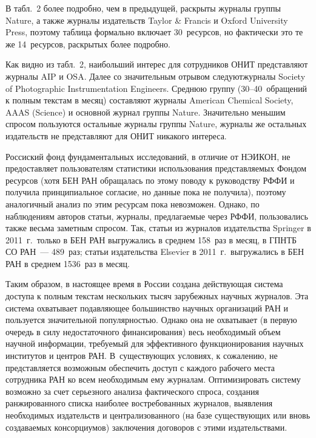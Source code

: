 \begin{multicols}{2}
     
     В табл.~2 более подробно, чем в предыдущей, раскрыты журналы 
группы Nature, а также журналы издательств Taylor \& Francis и Oxford 
University Press, поэтому таблица формально включает 30~ресурсов, но 
фактически это те же 14~ресурсов, раскрытых более подробно.
     
     Как видно из табл.~2, наибольший интерес для сотрудников ОНИТ 
     представляют журналы  AIP и OSA. Далее со 
значительным отрывом следуют\linebreak журна\-лы Society of Photographic 
Instrumentation Engineers. Среднюю группу (30--40~обращений к полным 
текстам в месяц) составляют журналы American Chemical Society, AAAS 
(Science) и основной журнал группы Nature. Значительно меньшим спросом 
пользуются остальные журналы группы Nature, журналы же остальных 
издательств не представляют для ОНИТ никакого интереса. 
     
     Россиский фонд фундаментальных исследований, в отличие от \mbox{НЭИКОН}, не 
     пред\-остав\-ля\-ет пользователям 
статистики использования пред\-став\-ля\-емых Фондом ресурсов (хотя БЕН РАН 
\mbox{обращалась} по этому поводу к руководству \mbox{РФФИ} и получила 
принципиальное согласие, но данные пока не получила), поэтому 
аналогичный анализ по этим ресурсам пока невозможен. Однако, по 
наблюдениям авторов статьи, журналы, предлагаемые через РФФИ, 
пользовались также весьма заметным спросом. Так, статьи из журналов 
издательства Springer в 2011~г.\ только в БЕН РАН выгружались в среднем 
158~раз в месяц, в ГПНТБ СО РАН~--- 489~раз; статьи издательства Elsevier 
в 2011~г.\ выгружались в БЕН РАН в среднем 1536~раз в месяц.
     
     Таким образом, в настоящее время в России созда\-на действующая 
система доступа к полным текстам нескольких тысяч зарубежных научных 
журналов. Эта система охватывает подавляющее большинство научных 
организаций РАН и пользуется значительной популярностью. Однако она не 
охватывает (в первую очередь в силу недостаточного финансирования) весь 
необходимый объем научной информации, требуемый для эффективного 
функционирования научных институтов и центров РАН. В~существующих 
условиях, к сожалению, не представляется возможным обеспечить доступ с 
каждого рабочего места сотрудника РАН ко всем необходимым ему 
журналам. Оптимизировать систему возможно за счет серьезного анализа 
фактического спроса, создания ранжированного списка наиболее 
востребованных журналов, выявления необходимых издательств и 
централизованного (на базе существующих или вновь создаваемых 
консорциумов) заключения договоров с этими из\-да\-тель\-ст\-вами.
     

\end{multicols}
